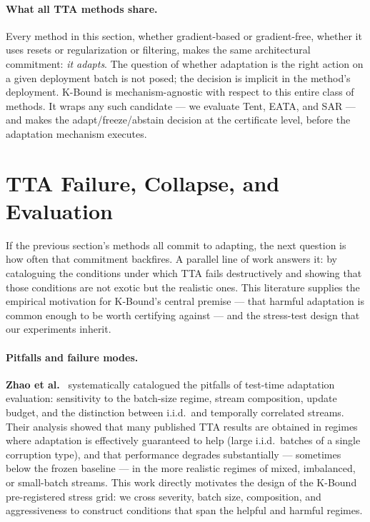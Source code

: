 \paragraph{What all TTA methods share.}
Every method in this section, whether gradient-based or gradient-free, whether
it uses resets or regularization or filtering, makes the same architectural
commitment: \emph{it adapts}.
The question of whether adaptation is the right action on a given deployment
batch is not posed; the decision is implicit in the method's deployment.
K-Bound is mechanism-agnostic with respect to this entire class of methods.
It wraps any such candidate --- we evaluate Tent, EATA, and SAR --- and
makes the adapt/freeze/abstain decision at the certificate level, before
the adaptation mechanism executes.

\section{TTA Failure, Collapse, and Evaluation}\label{sec:rel-failure}

If the previous section's methods all commit to adapting, the next question is
how often that commitment backfires. A parallel line of work answers it: by
cataloguing the conditions under which TTA fails destructively and showing that
those conditions are not exotic but the realistic ones. This literature supplies
the empirical motivation for K-Bound's central premise --- that harmful adaptation
is common enough to be worth certifying against --- and the stress-test design
that our experiments inherit.

\paragraph{Pitfalls and failure modes.}
\textbf{Zhao et al.}~\cite{zhao2023pitfalls} systematically catalogued the
pitfalls of test-time adaptation evaluation: sensitivity to the batch-size
regime, stream composition, update budget, and the distinction between
i.i.d.\ and temporally correlated streams.
Their analysis showed that many published TTA results are obtained in regimes
where adaptation is effectively guaranteed to help (large i.i.d.\ batches of
a single corruption type), and that performance degrades substantially ---
sometimes below the frozen baseline --- in the more realistic regimes of mixed,
imbalanced, or small-batch streams.
This work directly motivates the design of the K-Bound pre-registered stress
grid: we cross severity, batch size, composition, and aggressiveness to
construct conditions that span the helpful and harmful regimes.

